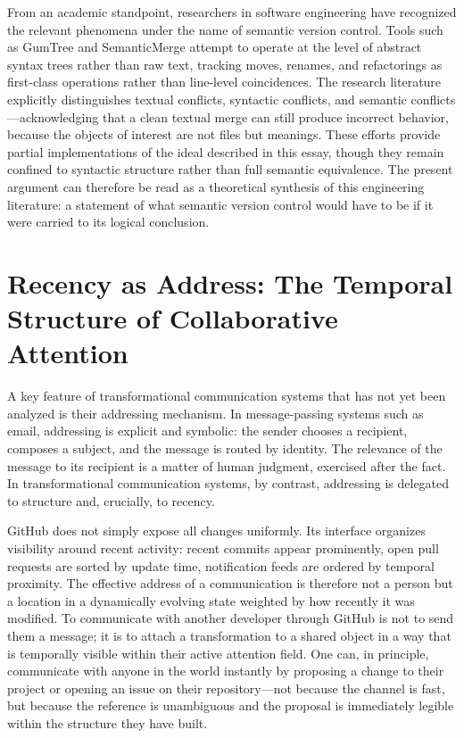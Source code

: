 \documentclass[12pt, letterpaper]{article}
\begin{document}
From an academic standpoint, researchers in software engineering have recognized the relevant phenomena under the name of semantic version control. Tools such as GumTree and SemanticMerge attempt to operate at the level of abstract syntax trees rather than raw text, tracking moves, renames, and refactorings as first-class operations rather than line-level coincidences. The research literature explicitly distinguishes textual conflicts, syntactic conflicts, and semantic conflicts---acknowledging that a clean textual merge can still produce incorrect behavior, because the objects of interest are not files but meanings. These efforts provide partial implementations of the ideal described in this essay, though they remain confined to syntactic structure rather than full semantic equivalence. The present argument can therefore be read as a theoretical synthesis of this engineering literature: a statement of what semantic version control would have to be if it were carried to its logical conclusion.

\section{Recency as Address: The Temporal Structure of Collaborative Attention}

A key feature of transformational communication systems that has not yet been analyzed is their addressing mechanism. In message-passing systems such as email, addressing is explicit and symbolic: the sender chooses a recipient, composes a subject, and the message is routed by identity. The relevance of the message to its recipient is a matter of human judgment, exercised after the fact. In transformational communication systems, by contrast, addressing is delegated to structure and, crucially, to recency.

GitHub does not simply expose all changes uniformly. Its interface organizes visibility around recent activity: recent commits appear prominently, open pull requests are sorted by update time, notification feeds are ordered by temporal proximity. The effective address of a communication is therefore not a person but a location in a dynamically evolving state weighted by how recently it was modified. To communicate with another developer through GitHub is not to send them a message; it is to attach a transformation to a shared object in a way that is temporally visible within their active attention field. One can, in principle, communicate with anyone in the world instantly by proposing a change to their project or opening an issue on their repository---not because the channel is fast, but because the reference is unambiguous and the proposal is immediately legible within the structure they have built.
\end{document}
